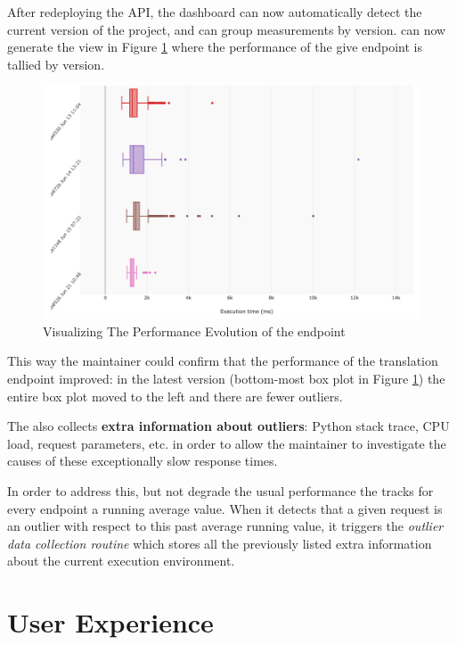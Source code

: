 \documentclass[conference]{IEEEtran}
\begin{document}
  After redeploying the API, the dashboard can now automatically detect the current version of the project, and can group measurements by version. \tool can now generate the view in Figure \ref{fig:tee} where the performance of the give endpoint is tallied by version.

    \begin{figure}[h!]
      \centering
      \includegraphics[width=\linewidth]{translation_endpoint_evolution.png}
      \caption{Visualizing The Performance Evolution of the \epTranslations endpoint}
      \label{fig:tee}
    \end{figure}

  This way the maintainer could confirm that the performance of the translation endpoint improved: in the latest version (bottom-most box plot in Figure \ref{fig:tee}) the entire box plot moved to the left and there are fewer outliers.


  \niceseparator

  The \tool also collects {\bf extra information about outliers}: Python stack trace, CPU load, request parameters, etc. in order to allow the maintainer to investigate the causes of these exceptionally slow response times. 

  In order to address this, but not degrade the usual performance the \tool tracks for every endpoint a running average value. When it detects that a given request is an outlier with respect to this past average running value, it triggers the {\em outlier data collection routine} which stores all the previously listed extra information about the current execution environment. 


\section {User Experience}
\label{sec:user}
\end{document}
